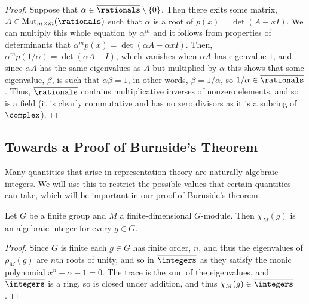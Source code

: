 \documentclass[fleqn]{NotesClass}
\DeclareMathOperator{\Mat}{Mat}
\newcommand{\algNumbers}{\overline{\rationals}}
\newcommand{\algIntegers}{\overline{\integers}}
\begin{document}
\begin{prp}{}{}
\begin{proof}
            \Step{\(\algNumbers\) is a Field}
            Suppose that \(\alpha \in \algNumbers \setminus \{0\}\).
            Then there exits some matrix, \(A \in \Mat_{m \times m}(\rationals)\) such that \(\alpha\) is a root of \(p(x) = \det(A - xI)\).
            We can multiply this whole equation by \(\alpha^m\) and it follows from properties of determinants that \(\alpha^m p(x) = \det(\alpha A - \alpha x I)\).
            Then, \(\alpha^m p(1/\alpha) = \det(\alpha A - I)\), which vanishes when \(\alpha A\) has eigenvalue \(1\), and since \(\alpha A\) has the same eigenvalues as \(A\) but multiplied by \(\alpha\) this shows that some eigenvalue, \(\beta\), is such that \(\alpha \beta = 1\), in other words, \(\beta = 1/\alpha\), so \(1/\alpha \in \algNumbers\).
            Thus, \(\algNumbers\) contains multiplicative inverses of nonzero elements, and so is a field  (it is clearly commutative and has no zero divisors as it is a subring of \(\complex\)).
        \end{proof}
    \end{prp}
    
    \subsection{Towards a Proof of Burnside's Theorem}
    Many quantities that arise in representation theory are naturally algebraic integers.
    We will use this to restrict the possible values that certain quantities can take, which will be important in our proof of Burnside's theorem.
    
    \begin{lma}{}{}
        Let \(G\) be a finite group and \(M\) a finite-dimensional \(G\)-module.
        Then \(\chi_M(g)\) is an algebraic integer for every \(g \in G\).
        \begin{proof}
            Since \(G\) is finite each \(g \in G\) has finite order, \(n\), and thus the eigenvalues of \(\rho_M(g)\) are \(n\)th roots of unity, and so in \(\algIntegers\) as they satisfy the monic polynomial \(x^n - \alpha - 1 = 0\).
            The trace is the sum of the eigenvalues, and \(\algIntegers\) is a ring, so is closed under addition, and thus \(\chi_M(g) \in \algIntegers\).
        \end{proof}
    \end{lma}
    
\end{document}

